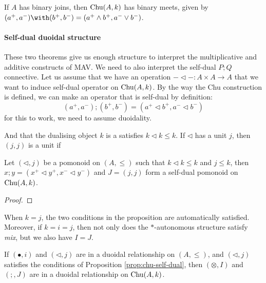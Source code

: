 \begin{proposition}
  If $A$ has binary joins, then $\mathrm{Chu}(A, k)$ has binary meets, given
  by $(a^+,a^-) \with (b^+,b^-) = (a^+ \land b^+, a^- \lor b^-)$.
\end{proposition}

\paragraph{Self-dual duoidal structure}
These two theorems give us enough structure to interpret the
multiplicative and additive constructs of MAV. We need to also
interpret the self-dual $P; Q$ connective. Let us assume that we have
an operation $-\lhd- : A \times A \to A$ that we want to induce
self-dual operator on $\mathrm{Chu}(A, k)$. By the way the Chu construction is
defined, we can make an operator that is self-dual by definition:
\begin{displaymath}
  (a^+, a^-) ; (b^+, b^-) = (a^+ \lhd b^+, a^- \lhd b^-)
\end{displaymath}
for this to work, we need to assume duoidality.

And that the dualising object $k$ is a
satisfies $k \lhd k \leq k$. If $\lhd$ has a unit $j$, then $(j, j)$ is a unit if

\begin{proposition}\label{prop:chu-self-dual}
  Let $(\lhd, j)$ be a pomonoid on $(A, \leq)$ such that
  $k \lhd k \leq k$ and $j \leq k$, then
  $x ; y = (x^+ \lhd y^+, x^- \lhd y^-)$ and $J = (j, j)$ form a
  self-dual pomonoid on $\mathrm{Chu}(A, k)$.
\end{proposition}

\begin{proof}
\end{proof}

\begin{remark}
  When $k = j$, the two conditions in the proposition are
  automatically satisfied. Moreover, if $k = i = j$, then not only
  does the $*$-autonomous structure satisfy \emph{mix}, but we also
  have $I =J$.
\end{remark}

\begin{lemma}
\end{lemma}

\begin{proposition}
  If $(\bullet, i)$ and $(\lhd, j)$ are in a duoidal relationship on
  $(A, \leq)$, and $(\lhd, j)$ satisfies the conditions of Proposition
  \ref{prop:chu-self-dual}, then $(\otimes, I)$ and $(;, J)$ are in a
  duoidal relationship on $\mathrm{Chu}(A, k)$.
\end{proposition}

